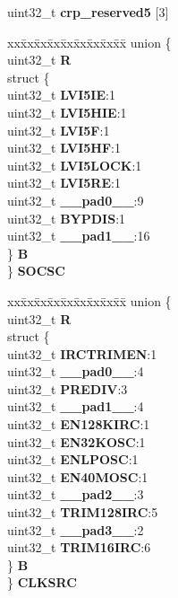 \begin{DoxyCompactItemize}
\begin{tabbing}
\end{tabbing}\item 
\mbox{\label{structCRP__tag_ab142d4dd06e65e271cc2794bf25b4564}} 
uint32\+\_\+t {\bfseries crp\+\_\+reserved5} \mbox{[}3\mbox{]}
\item 
\mbox{\label{structCRP__tag_a3bce42440931af1889a0a7acb45c3d5e}} 
\begin{tabbing}
xx\=xx\=xx\=xx\=xx\=xx\=xx\=xx\=xx\=\kill
union \{\\
\>uint32\_t {\bfseries R}\\
\>struct \{\\
\>\>uint32\_t {\bfseries LVI5IE}:1\\
\>\>uint32\_t {\bfseries LVI5HIE}:1\\
\>\>uint32\_t {\bfseries LVI5F}:1\\
\>\>uint32\_t {\bfseries LVI5HF}:1\\
\>\>uint32\_t {\bfseries LVI5LOCK}:1\\
\>\>uint32\_t {\bfseries LVI5RE}:1\\
\>\>uint32\_t {\bfseries \_\_pad0\_\_}:9\\
\>\>uint32\_t {\bfseries BYPDIS}:1\\
\>\>uint32\_t {\bfseries \_\_pad1\_\_}:16\\
\>\} {\bfseries B}\\
\} {\bfseries SOCSC}\\

\end{tabbing}\item 
\mbox{\label{structCRP__tag_ae16af76f3539018b511f6afe42642b47}} 
\begin{tabbing}
xx\=xx\=xx\=xx\=xx\=xx\=xx\=xx\=xx\=\kill
union \{\\
\>uint32\_t {\bfseries R}\\
\>struct \{\\
\>\>uint32\_t {\bfseries IRCTRIMEN}:1\\
\>\>uint32\_t {\bfseries \_\_pad0\_\_}:4\\
\>\>uint32\_t {\bfseries PREDIV}:3\\
\>\>uint32\_t {\bfseries \_\_pad1\_\_}:4\\
\>\>uint32\_t {\bfseries EN128KIRC}:1\\
\>\>uint32\_t {\bfseries EN32KOSC}:1\\
\>\>uint32\_t {\bfseries ENLPOSC}:1\\
\>\>uint32\_t {\bfseries EN40MOSC}:1\\
\>\>uint32\_t {\bfseries \_\_pad2\_\_}:3\\
\>\>uint32\_t {\bfseries TRIM128IRC}:5\\
\>\>uint32\_t {\bfseries \_\_pad3\_\_}:2\\
\>\>uint32\_t {\bfseries TRIM16IRC}:6\\
\>\} {\bfseries B}\\
\} {\bfseries CLKSRC}\\


\end{tabbing}
\end{DoxyCompactItemize}
